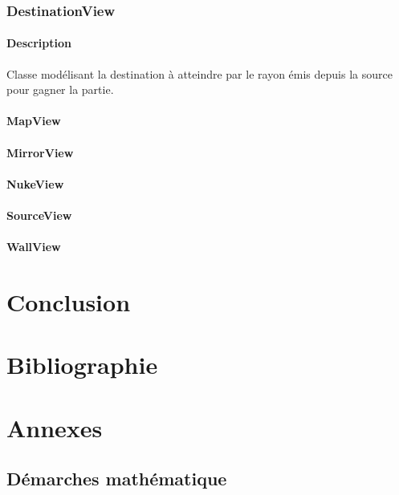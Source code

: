 \documentclass[]{article}
\begin{document}
\subsubsection{DestinationView}

\paragraph{Description}


Classe modélisant la destination à atteindre par le rayon émis depuis la source pour gagner la partie.

\paragraph{MapView}

\paragraph{MirrorView}

\paragraph{NukeView}

\paragraph{SourceView}

\paragraph{WallView}

\section{Conclusion}

\section{Bibliographie}

\section{Annexes}

\subsection{Démarches mathématique}
\end{document}
